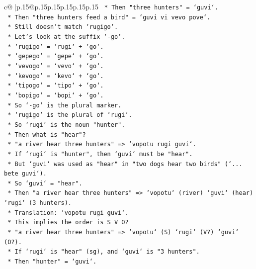 \documentclass{article}
\begin{document}
{\begin{supertabular}{c@{$\;$}|p{.15\linewidth}@{}p{.15\linewidth}p{.15\linewidth}p{.15\linewidth}p{.15\linewidth}p{.15\linewidth}}
{{{\texttt{                *   Then "three hunters" = `guvi`.} \\
\texttt{                *   Then "three hunters feed a bird" = `guvi vi vevo pove`.} \\
\texttt{                *   Still doesn't match `rugigo`.} \\
\texttt{                *   Let's look at the suffix `{-}go`.} \\
\texttt{                *   `rugigo` = `rugi` + `go`.} \\
\texttt{                *   `gepego` = `gepe` + `go`.} \\
\texttt{                *   `vevogo` = `vevo` + `go`.} \\
\texttt{                *   `kevogo` = `kevo` + `go`.} \\
\texttt{                *   `tipogo` = `tipo` + `go`.} \\
\texttt{                *   `bopigo` = `bopi` + `go`.} \\
\texttt{                *   So `{-}go` is the plural marker.} \\
\texttt{                *   `rugigo` is the plural of `rugi`.} \\
\texttt{                *   So `rugi` is the noun "hunter".} \\
\texttt{                *   Then what is "hear"?} \\
\texttt{                *   "a river hear three hunters" => `vopotu rugi guvi`.} \\
\texttt{                *   If `rugi` is "hunter", then `guvi` must be "hear".} \\
\texttt{                *   But `guvi` was used as "hear" in "two dogs hear two birds" (`... bete guvi`).} \\
\texttt{                *   So `guvi` = "hear".} \\
\texttt{                *   Then "a river hear three hunters" => `vopotu` (river) `guvi` (hear) `rugi` (3 hunters).} \\
\texttt{                *   Translation: `vopotu rugi guvi`.} \\
\texttt{                *   This implies the order is S V O?} \\
\texttt{                *   "a river hear three hunters" => `vopotu` (S) `rugi` (V?) `guvi` (O?).} \\
\texttt{                *   If `rugi` is "hear" (sg), and `guvi` is "3 hunters".} \\
\texttt{                *   Then "hunter" = `guvi`.} \\
}}}
\end{supertabular}}
\end{document}
